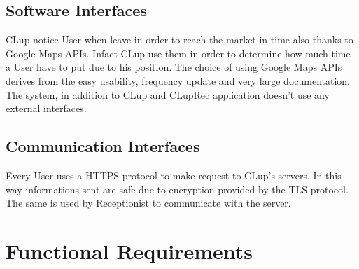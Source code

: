 \subsection{Software Interfaces}
CLup notice User when leave in order to reach the market in time also thanks to Google Maps APIs. Infact CLup use them in order to determine how much time a User have to put due to his position.
The choice of using Google Maps APIs derives from the easy usability, frequency update and very large documentation.
The system, in addition to CLup and CLupRec application doesn't use any external interfaces.


\subsection{Communication Interfaces}
Every User uses a HTTPS protocol to make request to CLup's servers. In this way informations sent are safe due to encryption provided by the TLS protocol. The same is used by Receptionist to communicate with the server.
\section{Functional Requirements}

